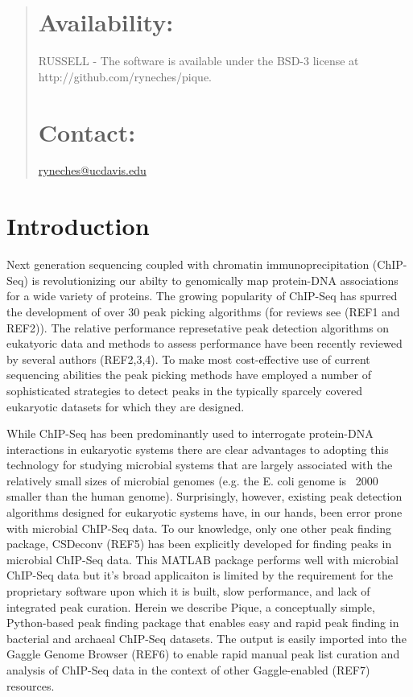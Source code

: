 \documentclass{bioinfo} %
\begin{document}
{\begin{abstract}
\section{Availability:} RUSSELL - The software is available under the
BSD-3 license at http://github.com/ryneches/pique.

\section{Contact:} \href{ryneches@ucdavis.edu}{ryneches@ucdavis.edu}

\end{abstract}

\section{Introduction} Next generation sequencing coupled with chromatin
immunoprecipitation (ChIP-Seq) is revolutionizing our abilty to
genomically map protein-DNA associations for a wide variety of proteins.
The growing popularity of ChIP-Seq has spurred the development of over
30 peak picking algorithms (for reviews see (REF1 and REF2)). The
relative performance represetative peak detection algorithms on
eukatyoric data and methods to assess performance have been recently
reviewed by several authors (REF2,3,4).  To make most cost-effective use
of current sequencing abilities the peak picking methods have employed a
number of sophisticated strategies to detect peaks in the typically
sparcely covered eukaryotic datasets for which they are designed.

While ChIP-Seq has been predominantly used to interrogate protein-DNA
interactions in eukaryotic systems there are clear advantages to
adopting this technology for studying microbial systems that are largely
associated with the relatively small sizes of microbial genomes (e.g.
the E. coli genome is ~2000 smaller than the human genome).
Surprisingly, however, existing peak detection algorithms designed for
eukaryotic systems have, in our hands, been error prone with microbial
ChIP-Seq data.  To our knowledge, only one other peak finding package,
CSDeconv (REF5) has been explicitly developed for finding peaks in
microbial ChIP-Seq data.  This MATLAB package performs well with
microbial ChIP-Seq data but it's broad applicaiton is limited by the
requirement for the proprietary software upon which it is built,
slow performance, and lack of integrated peak curation. 
Herein we describe Pique, a conceptually simple, Python-based peak
finding package that enables easy and rapid peak finding in bacterial
and archaeal ChIP-Seq datasets.  The output is easily imported into the
Gaggle Genome Browser (REF6) to enable rapid manual peak list curation
and analysis of ChIP-Seq data in the context of other Gaggle-enabled
(REF7) resources.

}
\end{document}

